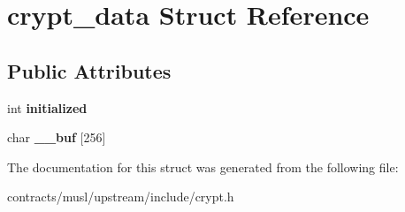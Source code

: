 \hypertarget{structcrypt__data}{}\section{crypt\+\_\+data Struct Reference}
\label{structcrypt__data}
\subsection*{Public Attributes}
\begin{DoxyCompactItemize}
\item 
\mbox{\label{structcrypt__data_ac15ee70f8a33cfd44665fc7d68a6916d}} 
int {\bfseries initialized}
\item 
\mbox{\label{structcrypt__data_ac998abb091ddce3fcd0655c2ce4ead91}} 
char {\bfseries \+\_\+\+\_\+buf} \mbox{[}256\mbox{]}
\end{DoxyCompactItemize}


The documentation for this struct was generated from the following file\+:\begin{DoxyCompactItemize}
\item 
contracts/musl/upstream/include/crypt.\+h\end{DoxyCompactItemize}
